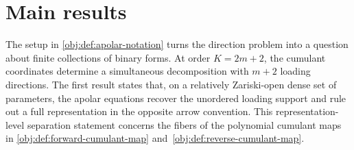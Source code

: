 \section{Main results}

The setup in \cref{obj:def:apolar-notation} turns the direction problem into a question about finite collections of binary forms. At order \(K=2m+2\), the cumulant coordinates determine a simultaneous decomposition with \(m+2\) loading directions. The first result states that, on a relatively Zariski-open dense set of parameters, the apolar equations recover the unordered loading support and rule out a full representation in the opposite arrow convention. This representation-level separation statement concerns the fibers of the polynomial cumulant maps in \cref{obj:def:forward-cumulant-map} and~\cref{obj:def:reverse-cumulant-map}.

